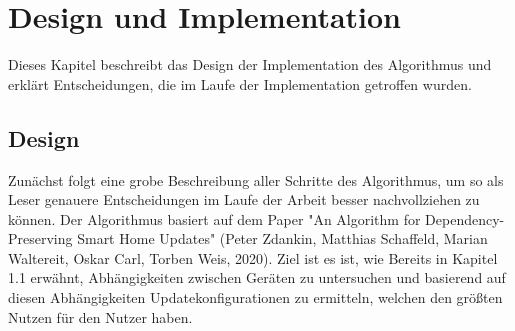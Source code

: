 \chapter{Design und Implementation}\label{ch:eval}

Dieses Kapitel beschreibt das Design der Implementation des Algorithmus und erklärt Entscheidungen, die im
Laufe der Implementation getroffen wurden.

\section{Design}

Zunächst folgt eine grobe Beschreibung aller Schritte des Algorithmus, um so als Leser genauere Entscheidungen im Laufe der Arbeit
besser nachvollziehen zu können. Der Algorithmus basiert auf dem Paper "An Algorithm for Dependency-Preserving Smart
Home Updates" (Peter Zdankin, Matthias Schaffeld, Marian Waltereit, Oskar Carl, Torben Weis, 2020). Ziel ist es
ist, wie Bereits in Kapitel 1.1 erwähnt, Abhängigkeiten zwischen Geräten zu untersuchen und basierend auf diesen Abhängigkeiten
Updatekonfigurationen zu ermitteln, welchen den größten Nutzen für den Nutzer haben. 
